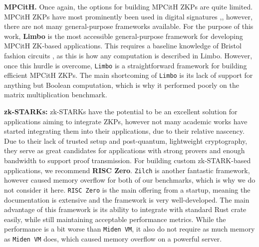 \textbf{MPCitH.}
Once again, the options for building MPCitH ZKPs are quite limited. MPCitH ZKPs have most prominently been used in digital signatures \cite{PQC_MIRATH_Website, aragon2023ryde, SDITH_Website},, however, there are not many general-purpose frameworks available. For the purpose of this work, \textbf{Limbo} is the most accessible general-purpose framework for developing MPCitH ZK-based applications. This requires a baseline knowledge of Bristol fashion circuits \cite{bristol}, as this is how any computation \Cir is described in Limbo. However, once this hurdle is overcome, \texttt{Limbo} is a straightforward framework for building efficient MPCitH ZKPs. The main shortcoming of \texttt{Limbo} is its lack of support for anything but Boolean computation, which is why it performed poorly on the matrix multiplication benchmark. 




\textbf{zk-STARKs: } zk-STARKs have the potential to be an excellent solution for applications aiming to integrate ZKPs, however not many academic works have started integrating them into their applications, due to their relative nascency. Due to their lack of trusted setup and post-quantum, lightweight cryptography, they serve as great candidates for applications with strong provers and enough bandwidth to support proof transmission.
For building custom zk-STARK-based applications, we recommend \textbf{RISC Zero}. 
\texttt{Zilch} is another fantastic framework, however caused memory overflow for both of our benchmarks, which is why we do not consider it here. 
\texttt{RISC Zero} is the main offering from a startup, meaning the documentation is extensive and the framework is very well-developed. The main advantage of this framework is its ability to integrate with standard Rust crate easily, while still maintaining acceptable performance metrics. While the performance is a bit worse than \texttt{Miden VM}, it also do not require as much memory as \texttt{Miden VM} does, which caused memory overflow on a powerful server.

